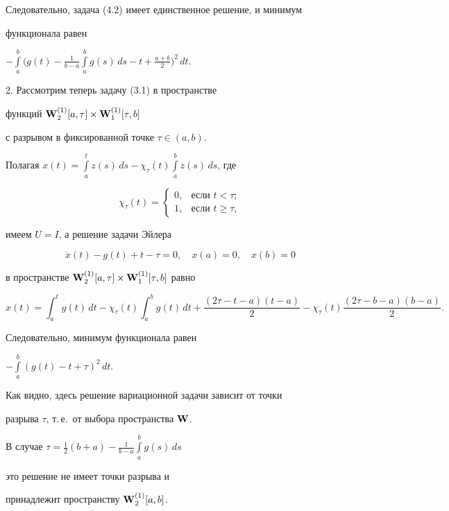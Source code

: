 \begin{exam}
Следовательно, задача (4.2) имеет единственное решение, и минимум


функционала равен


$-\int\limits_a^b\Big(g(t)-\frac1{b-a}\int\limits_a^bg(s)\,ds-t+


\frac{a+b}2\Big)^2\,dt$.





2. Рассмотрим теперь задачу (3.1) в пространстве


функций $\bold W{}_2^{(1)}[a,\tau]\times\bold W{}_1^{(1)}[\tau,b]$


с разрывом в фиксированной точке $\tau\in(a,b)$.


Полагая $x(t)=\int\limits_a^tz(s)\,ds-


\chi_\tau(t)\int\limits_a^bz(s)\,ds$, где


$$


\chi_\tau(t)=


\begin{cases} 0,&\text{если }t<\tau;\\ 1,&\text{если }t\ge\tau,


\end{cases}


$$


имеем $U=I$, а решение задачи Эйлера


$$


\Dot x(t)-g(t)+t-\tau=0,\quad x(a)=0,\quad x(b)=0


$$


в пространстве $\bold W{}_2^{(1)}[a,\tau]\times\bold W{}_1^{(1)}[\tau,b]$ равно


$$


x(t)=\int_a^tg(t)\,dt-\chi_\tau(t)\int_a^bg(t)\,dt


+\frac{(2\tau-t-a)(t-a)}2-\chi_\tau(t)\frac{(2\tau-b-a)(b-a)}2.


$$


Следовательно, минимум функционала равен


$-\int\limits_a^b(g(t)-t+\tau)^2\,dt$.


Как видно, здесь решение вариационной задачи зависит от точки


разрыва $\tau$, т.\,е.~от выбора пространства $\bold W{}$.


В случае $\tau=\frac{1}{2}(b+a)-\frac{1}{b-a}\int\limits_a^bg(s)\,ds$


это решение не имеет точки разрыва и


принадлежит пространству $\bold W{}_2^{(1)}[a,b]$.






\end{exam}
